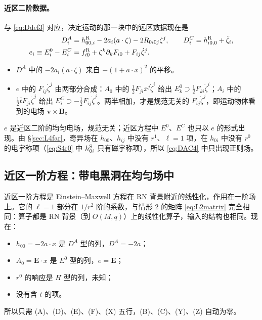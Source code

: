 \documentclass[11pt,a4paper]{ctexart}
\numberwithin{equation}{section}
\begin{document}
\paragraph{近区二阶数据。}与 \eqref{eq:Ddef3} 对应，决定运动的那一块中的远区数据现在是
\begin{align}
D^A_i&=h^{\rm R}_{00,i}-2a_i(a\cdot\zeta)-2R_{0i0j}\zeta^j,\qquad D^C_i=h^{\rm R}_{i0,0}+\ddot\zeta_i,\label{eq:DAC4}\\
e_i\equiv E^0_i-E^C_i&=f^{\rm R}_{i0}+\zeta^k\partial_kF_{i0}+F_{ij}\dot\zeta^j .\label{eq:e4}
\end{align}
\begin{itemize}
\item $D^A$ 中的 $-2a_i(a\cdot\zeta)$ 来自 $-(1+a\cdot x)^2$ 的平移。
\item $e$ 中的 $F_{ij}\dot\zeta^j$ 由两部分合成：$A_0$ 中的 $\tfrac12F_{ji}\bar x^j\dot\zeta^i$ 给出 $E^0_k\supset\tfrac12F_{ki}\dot\zeta^i$；$A_i$ 中的 $\tfrac12\bar tF_{ji}\dot\zeta^j$ 给出 $E^C_i\supset-\tfrac12F_{ij}\dot\zeta^j$。两半相加，才是规范无关的 $F_{ij}\dot\zeta^j$，即运动物体看到的电场 $\boldsymbol v\times\boldsymbol B$。
\end{itemize}
$e$ 是近区二阶的均匀电场，规范无关；近区方程中 $E^0$、$E^C$ 也只以 $e$ 的形式出现。由 \S\ref{sec:L4far}，奇异场在 $h_{00}$、$h_{ij}$ 中没有 $r^1$、$\ell=1$ 项，在 $h_{0i}$ 中没有 $r^0$ 的电宇称项（\eqref{eq:S4r0} 中 $h^{\rm S}_{0i}$ 只有磁宇称项），所以 \eqref{eq:DAC4} 中只出现正则场。

\subsection{近区一阶方程：带电黑洞在均匀场中}
\label{sec:L4first}

近区一阶方程是 Einstein--Maxwell 方程在 RN 背景附近的线性化，作用在一阶场上。它的 $\ell=1$ 部分在 $1/r^2$ 阶的系数，与情形 2 的矩阵 \eqref{eq:L2matrix} 完全相同：算子都是 RN 背景（到 $O(M,q)$）上的线性化算子，输入的结构也相同。现在：
\begin{itemize}
\item $h_{00}=-2a\cdot x$ 是 $D^A$ 型的列，$D^A=-2a$；
\item $A_0=\boldsymbol E\cdot x$ 是 $E^0$ 型的列，$e=\boldsymbol E$；
\item $r^0$ 的响应是 $H$ 型的列，未知；
\item 没有含 $t$ 的项。
\end{itemize}
所以只需 (A)、(D)、(E)、(F)、(X) 五行，(B)、(C)、(Y)、(Z) 自动为零。
\end{document}
